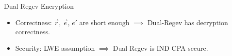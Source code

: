 \documentclass[xcolor=table,10pt,aspectratio=169]{beamer}
\begin{document}
\begin{frame}{Dual-Regev Encryption~\cite{STOC:Regev05,STOC:GenPeiVai08}}
  \begin{figure}
  \begin{pchstack}[boxed]

    \pchspace

    \begin{pcvstack}[]

      \pcvspace

    \end{pcvstack}
  \end{pchstack}
  \end{figure}
  \vfill
  \begin{itemize}[label=\textbullet]
    \item Correctness: \(\vec{r}\), \(\vec{e}\), \(e'\) are short enough \(\implies\) Dual-Regev has decryption correctness.
      \vfill
    \item Security: LWE assumption \(\implies\) Dual-Regev is IND-CPA secure.
  \end{itemize}
\end{frame}
\end{document}
